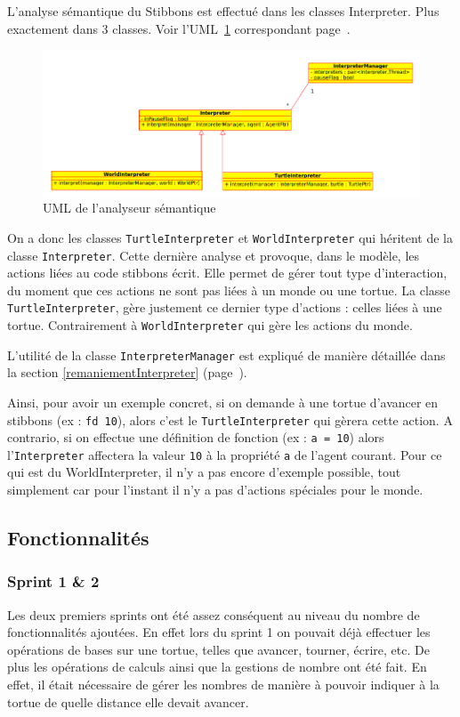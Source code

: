 L'analyse sémantique du Stibbons est effectué dans les classes Interpreter. Plus exactement dans 3 classes. Voir l'UML~\ref{interpreterUML} correspondant page~\pageref{interpreterUML}.

\begin{figure}[h]
\caption{\label{interpreterUML} UML de l'analyseur sémantique}
\includegraphics[scale=0.5]{doc/report/uml/interpreterUML.png}
\end{figure}

On a donc les classes \verb|TurtleInterpreter| et \verb|WorldInterpreter| qui héritent de la classe \verb|Interpreter|. Cette dernière analyse et provoque, dans le modèle, les actions liées au code stibbons écrit. Elle permet de gérer tout type d'interaction, du moment que ces actions ne sont pas liées à un monde ou une tortue. La classe \verb|TurtleInterpreter|, gère justement ce dernier type d'actions : celles liées à une tortue. Contrairement à \verb|WorldInterpreter| qui gère les actions du monde.

L'utilité de la classe \verb|InterpreterManager| est expliqué de manière détaillée dans la section \ref{remaniementInterpreter} (page~\pageref{remaniementInterpreter}).

Ainsi, pour avoir un exemple concret, si on demande à une tortue d'avancer en stibbons (ex : \verb|fd 10|), alors c'est le \verb|TurtleInterpreter| qui gèrera cette action.
A contrario, si on effectue une définition de fonction (ex : \verb|a = 10|) alors l'\verb|Interpreter| affectera la valeur \verb|10| à la propriété \verb|a| de l'agent courant.
Pour ce qui est du WorldInterpreter, il n'y a pas encore d'exemple possible, tout simplement car pour l'instant il n'y a pas d'actions spéciales pour le monde.

\subsection{Fonctionnalités}

\subsubsection{Sprint 1 \& 2}
Les deux premiers sprints ont été assez conséquent au niveau du nombre de fonctionnalités ajoutées.
En effet lors du sprint 1 on pouvait déjà effectuer les opérations de bases sur une tortue, telles que avancer, tourner, écrire, etc. De plus les opérations de calculs ainsi que la gestions de nombre ont été fait. En effet, il était nécessaire de gérer les nombres de manière à pouvoir indiquer à la tortue de quelle distance elle devait avancer.

